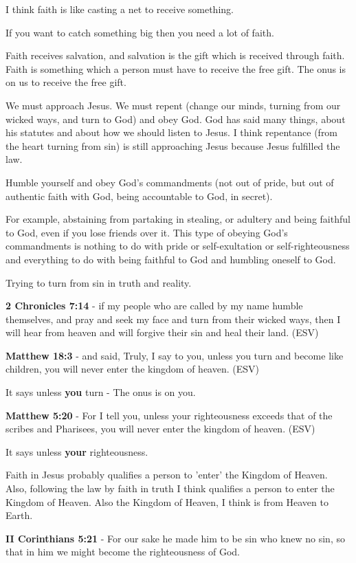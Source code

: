 \documentclass[11pt]{article}
\begin{document}
I think faith is like casting a net to receive something.

If you want to catch something big then you need a lot of faith.

Faith receives salvation, and salvation is the gift which is received through faith.
Faith is something which a person must have to receive the free gift.
The onus is on us to receive the free gift.

We must approach Jesus.
We must repent (change our minds, turning from our wicked ways, and turn to God) and obey God.
God has said many things, about his statutes and about how we should listen to Jesus.
I think repentance (from the heart turning from sin) is still approaching Jesus because Jesus fulfilled the law.

Humble yourself and obey God's commandments (not out of pride, but out of authentic faith with God, being accountable to God, in secret).

For example, abstaining from partaking in stealing, or adultery and being faithful to God, even if you lose friends over it.
This type of obeying God's commandments is nothing to do with pride or self-exultation or self-righteousness and everything to do with being faithful to God and humbling oneself to God.

Trying to turn from sin in truth and reality.

\textbf{2 Chronicles 7:14} - if my people who are called by my name humble themselves, and pray and seek my face and turn from their wicked ways, then I will hear from heaven and will forgive their sin and heal their land. (ESV)

\textbf{Matthew 18:3} - and said, Truly, I say to you, unless you turn and become like children, you will never enter the kingdom of heaven. (ESV)

It says unless \textbf{you} turn - The onus is on you.

\textbf{Matthew 5:20} - For I tell you, unless your righteousness exceeds that of the scribes and Pharisees, you will never enter the kingdom of heaven. (ESV)

It says unless \textbf{your} righteousness.

Faith in Jesus probably qualifies a person to 'enter' the Kingdom of Heaven.
Also, following the law by faith in truth I think qualifies a person to enter the Kingdom of Heaven.
Also the Kingdom of Heaven, I think is from Heaven to Earth.

\textbf{II Corinthians 5:21} - For our sake he made him to be sin who knew no sin, so that in him we might become the righteousness of God.
\end{document}
